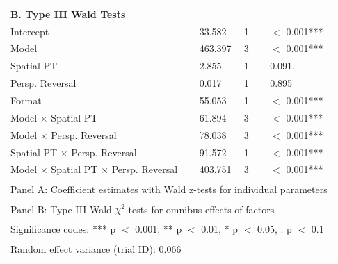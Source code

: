 \begin{table}[!h]
{\begin{tabular}[t]{lllll}
\textbf{B. Type III Wald Tests} &  &  &  & \\
Intercept & 33.582 & 1 &  & $<$ 0.001***\\
Model & 463.397 & 3 &  & $<$ 0.001***\\
Spatial PT & 2.855 & 1 &  & 0.091.\\
Persp. Reversal & 0.017 & 1 &  & 0.895\\
Format & 55.053 & 1 &  & $<$ 0.001***\\
Model $\times$ Spatial PT & 61.894 & 3 &  & $<$ 0.001***\\
Model $\times$ Persp. Reversal & 78.038 & 3 &  & $<$ 0.001***\\
Spatial PT $\times$ Persp. Reversal & 91.572 & 1 &  & $<$ 0.001***\\
Model $\times$ Spatial PT $\times$ Persp. Reversal & 403.751 & 3 &  & $<$ 0.001***\\
\bottomrule
\multicolumn{5}{l}{\textsuperscript{} Panel A: Coefficient estimates with Wald z-tests for individual parameters}\\
\multicolumn{5}{l}{\textsuperscript{} Panel B: Type III Wald $\chi^2$ tests for omnibus effects of factors}\\
\multicolumn{5}{l}{\textsuperscript{} Significance codes: *** p $<$ 0.001, ** p $<$ 0.01, * p $<$ 0.05, . p $<$ 0.1}\\
\multicolumn{5}{l}{\textsuperscript{} Random effect variance (trial ID): 0.066}\\
\end{tabular}}
\end{table}
